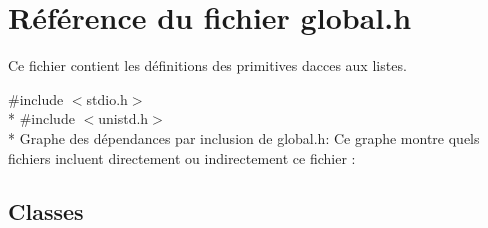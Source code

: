 \hypertarget{a00020}{}\section{Référence du fichier global.\+h}
\label{a00020}


Ce fichier contient les définitions des primitives d\textquotesingle{}acces aux listes.  


{\ttfamily \#include $<$stdio.\+h$>$}\\*
{\ttfamily \#include $<$unistd.\+h$>$}\\*
Graphe des dépendances par inclusion de global.\+h\+:
Ce graphe montre quels fichiers incluent directement ou indirectement ce fichier \+:
\subsection*{Classes}
